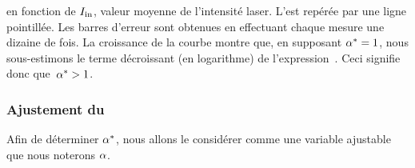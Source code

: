 %
en fonction de ${{I}_{\rm in}}$, valeur moyenne de l'intensité laser. L'\intsat est repérée par une ligne pointillée. Les barres d'erreur sont obtenues en effectuant chaque mesure une dizaine de fois.
La croissance de la courbe montre que, en supposant ${{\alpha}^{*}} = 1$, nous sous-estimons le terme décroissant (en logarithme) de l'expression~. Ceci signifie donc que~${{\alpha}^{*}} > 1$.

\casse 

\subsubsection{Ajustement du \pdc}
Afin de déterminer ${{\alpha}^{*}}$, nous allons %
 le considérer comme une variable ajustable que nous noterons ${\alpha}$.%
 

